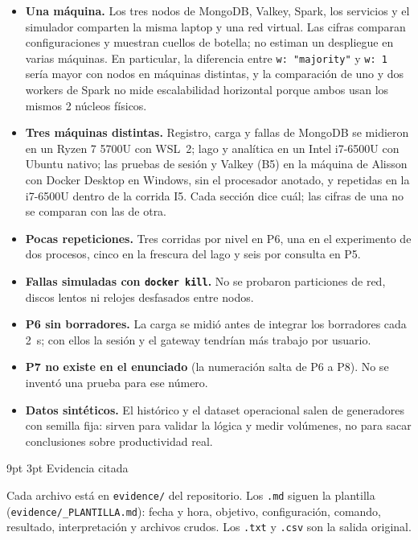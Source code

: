 \documentclass[10pt,letterpaper]{article}
\makeatletter
\renewcommand\section{\@startsection{section}{1}{\z@}%
  {9pt \@plus 2pt \@minus 1pt}{3pt}%
  {\normalfont\large\bfseries\color{acc}}}
\makeatother
\begin{document}
\begin{itemize}\setlength{\itemsep}{1pt}
\item \textbf{Una máquina.} Los tres nodos de MongoDB, Valkey, Spark, los servicios y el simulador comparten la
misma laptop y una red virtual. Las cifras comparan configuraciones y muestran cuellos de botella; no estiman
un despliegue en varias máquinas. En particular, la diferencia entre \texttt{w: "majority"} y
\texttt{w: 1} sería mayor con nodos en máquinas distintas, y la comparación de uno y dos workers de Spark no
mide escalabilidad horizontal porque ambos usan los mismos 2 núcleos físicos.
\item \textbf{Tres máquinas distintas.} Registro, carga y fallas de MongoDB se midieron en un Ryzen 7 5700U con
WSL~2; lago y analítica en un Intel i7-6500U con Ubuntu nativo; las pruebas de sesión y Valkey (B5) en la
máquina de Alisson con Docker Desktop en Windows, sin el procesador anotado, y repetidas en la i7-6500U
dentro de la corrida I5. Cada sección dice cuál; las cifras de una no se comparan con las de otra.
\item \textbf{Pocas repeticiones.} Tres corridas por nivel en P6, una en el experimento de dos procesos, cinco
en la frescura del lago y seis por consulta en P5.
\item \textbf{Fallas simuladas con \texttt{docker kill}.} No se probaron particiones de red, discos lentos ni
relojes desfasados entre nodos.
\item \textbf{P6 sin borradores.} La carga se midió antes de integrar los borradores cada 2~s; con ellos la
sesión y el gateway tendrían más trabajo por usuario.
\item \textbf{P7 no existe en el enunciado} (la numeración salta de P6 a P8). No se inventó una prueba para
ese número.
\item \textbf{Datos sintéticos.} El histórico y el dataset operacional salen de generadores con semilla fija:
sirven para validar la lógica y medir volúmenes, no para sacar conclusiones sobre productividad real.
\end{itemize}

\appendix
\section{Evidencia citada}

Cada archivo está en \texttt{evidence/} del repositorio. Los \texttt{.md} siguen la plantilla
(\texttt{evidence/\_PLANTILLA.md}): fecha y hora, objetivo, configuración, comando, resultado,
interpretación y archivos crudos. Los \texttt{.txt} y \texttt{.csv} son la salida original.
\end{document}
